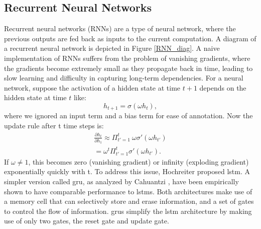 \subsection{Recurrent Neural Networks}
\label{POMDP_RNN}
Recurrent neural networks (RNNs) are a type of neural network, where the previous outputs are fed back as inputs to the current computation. A diagram of a 
recurrent neural network is depicted in Figure \ref{RNN_diag}. 
A naive implementation of RNNs suffers from the problem of vanishing gradients, where the gradients become extremely small as they propagate back in time, 
leading to slow learning and difficulty in capturing long-term dependencies.
For a neural network, suppose the activation of a hidden state at time $t+1$ depends on the hidden state at time $t$ like:
\begin{equation}
    h_{t+1} = \sigma(\omega h_t),
\end{equation}
where we ignored an input term and a bias term for ease of annotation. Now the update rule after t time steps is:
\begin{align*}
        \frac{\partial h_t}{\partial h_1} \approx \Pi_{t'=1}^t \ \omega \sigma'(\omega h_{t'}) \\
        = \omega^{t} \Pi_{t'=1}^t \sigma'(\omega h_{t'}).
\end{align*}
If $\omega \neq 1$, this becomes zero (vanishing gradient) or infinity (exploding gradient) exponentially quickly with t.
To address this issue, Hochreiter \etal \cite{s_lstm} proposed \ac{lstm}. A simpler version called \ac{gru}, 
as analyzed by Cahuantzi \etAl \cite{cahuantzi2023comparison}, have been empirically shown to have comparable performance to \ac{lstm}s. 
Both architectures make use of a memory cell that can selectively store and erase information, and a set of gates to control the flow of information. 
\ac{gru}s simplify the \ac{lstm} architecture by making use of only two gates, the reset gate and update gate.

